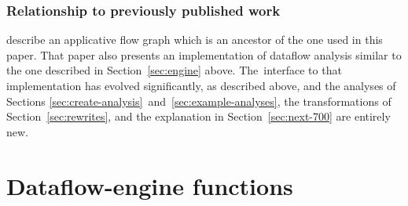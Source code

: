 \documentclass[blockstyle,preprint,natbib,nocopyrightspace]{sigplanconf}
\newcommand\secref[1]{Section~\ref{sec:#1}}
\newcommand\secreftwo[2]{Sections \ref{sec:#1}~and~\ref{sec:#2}}
\begin{document}
\makeatother

\providecommand\includeftpref{\relax} %


\subsubsection*{Relationship to previously published work}

\citet{ramsey-dias:applicative-flow-graph} describe
an applicative flow graph which is
an ancestor of the one used in this paper. 
That paper also presents an implementation of dataflow analysis
similar to the one described in \secref{engine} above.
The~interface to that implementation has evolved significantly, as
described above, and the analyses of
\secreftwo{create-analysis}{example-analyses}, the transformations of
\secref{rewrites}, and the 
explanation in \secref{next-700} are entirely new.



\clearpage

\appendix

\section{Dataflow-engine functions}
\end{document}
